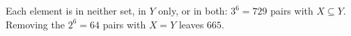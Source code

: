 Each element is in neither set, in $Y$ only, or in both: $3^6=729$ pairs with $X\subseteq Y$. Removing the $2^6=64$ pairs with $X=Y$ leaves $\boxed{665}$.
